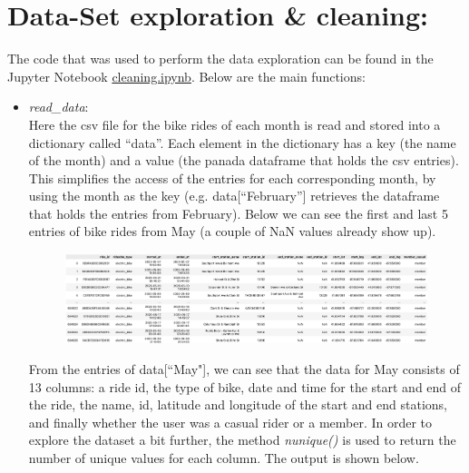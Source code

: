 \documentclass[12pt]{article}
\begin{document}
\section*{Data-Set exploration \& cleaning:}
The code that was used to perform the data exploration can be found in the Jupyter Notebook \href{https://github.com/SummerKassem/BikeShareCS/blob/main/Code/cleaning.ipynb}{cleaning.ipynb}. Below are the main functions:
\begin{itemize}
	\item \textit{read\_data}:\\
	Here the csv file for the bike rides of each month is read and stored into a dictionary called “data”. Each element in the dictionary has a key (the name of the month) and a value (the panada dataframe that holds the csv entries). This simplifies the access of the entries for each corresponding month, by using the month as the key (e.g. data[“February”] retrieves the dataframe that holds the entries from February). Below we can see the first and last 5 entries of bike rides from May (a couple of NaN values already show up).

	\begin{figure}[h]
	\hspace{-1.8cm}
	\includegraphics[width=8 in, height = 2 in]{imgMay.png}
	\end{figure}
	\pagebreak
	
	From the entries of data[``May"], we can see that the data for May consists of 13 columns: a ride id, the type of bike, date and time for the start and end of the ride, the name, id, latitude and longitude of the start and end stations, and finally whether the user was a casual rider or a member. In order to explore the dataset a bit further, the method \textit{nunique()} is used to return the number of unique values for each column. The output is shown below. 
	

\end{itemize}
\end{document}
